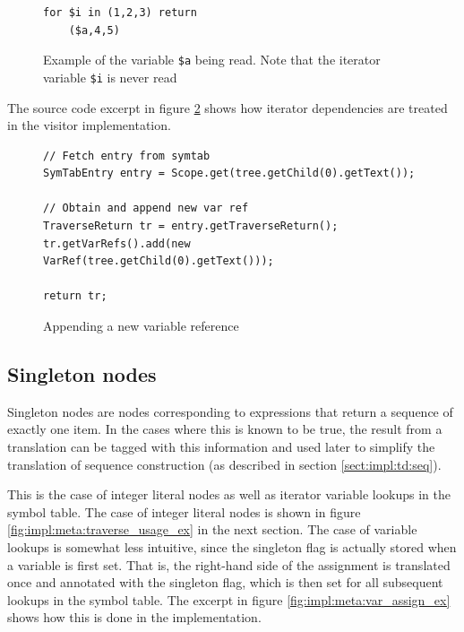 \begin{figure}[!htp]
\begin{center}
\begin{minipage}[h]{5cm}
\begin{verbatim}
for $i in (1,2,3) return 
    ($a,4,5)
\end{verbatim}
\end{minipage}
  \caption{Example of the variable \texttt{\$a} being read. Note that the iterator
  variable \texttt{\$i} is never read}
  \label{fig:impl:meta:var_ref_ex}
\end{center}
\end{figure}

The source code excerpt in figure \ref{fig:impl:meta:var_ref_impl2} shows how
iterator dependencies are treated in the visitor implementation.

\begin{figure}[!htp]
\begin{center}
\begin{Verbatim}
// Fetch entry from symtab
SymTabEntry entry = Scope.get(tree.getChild(0).getText());
            
// Obtain and append new var ref
TraverseReturn tr = entry.getTraverseReturn();
tr.getVarRefs().add(new VarRef(tree.getChild(0).getText()));

return tr;
\end{Verbatim}
  \caption{Appending a new variable reference}
  \label{fig:impl:meta:var_ref_impl2}
\end{center}
\end{figure}

\subsection{Singleton nodes}
Singleton nodes are nodes corresponding to expressions that return a sequence of exactly one item. In
the cases where this is known to be true, the result from a translation can be
tagged with this information and used later to simplify the translation of
sequence construction (as described in section \ref{sect:impl:td:seq}).

This is the case of integer literal nodes as well as iterator variable lookups in the
symbol table. The case of integer literal nodes is shown in figure
\ref{fig:impl:meta:traverse_usage_ex} in the next section. The case of variable
lookups is somewhat less intuitive, since the singleton flag is actually
stored when a variable is first set. That is, the right-hand side of the
assignment is translated once and annotated with the singleton flag, which is
then set for all subsequent lookups in the symbol table. The excerpt in figure 
\ref{fig:impl:meta:var_assign_ex} shows how this is done in the implementation.

